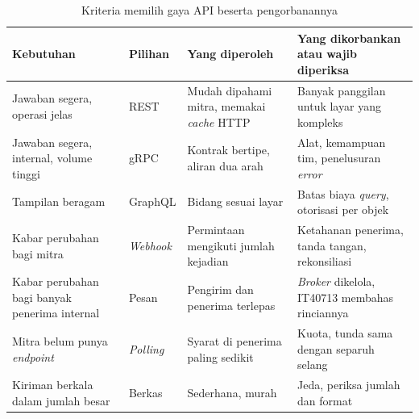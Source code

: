 \begin{table}[!htb]
  \centering
  \caption{Kriteria memilih gaya API beserta pengorbanannya}
  \label{tab:ch05-kriteria}
  \footnotesize
  \begin{tabularx}{\textwidth}{V{2.8cm}V{2.0cm}UU}
    \hline
    \textbf{Kebutuhan} & \textbf{Pilihan} & \textbf{Yang diperoleh} & \textbf{Yang dikorbankan atau wajib diperiksa} \\ \hline
    Jawaban segera, operasi jelas & REST & Mudah dipahami mitra, memakai \textit{cache} HTTP & Banyak panggilan untuk layar yang kompleks \\ \hline
    Jawaban segera, internal, volume tinggi & gRPC & Kontrak bertipe, aliran dua arah & Alat, kemampuan tim, penelusuran \textit{error} \\ \hline
    Tampilan beragam & GraphQL & Bidang sesuai layar & Batas biaya \textit{query}, otorisasi per objek \\ \hline
    Kabar perubahan bagi mitra & \textit{Webhook} & Permintaan mengikuti jumlah kejadian & Ketahanan penerima, tanda tangan, rekonsiliasi \\ \hline
    Kabar perubahan bagi banyak penerima internal & Pesan & Pengirim dan penerima terlepas & \textit{Broker} dikelola, IT40713 membahas rinciannya \\ \hline
    Mitra belum punya \textit{endpoint} & \textit{Polling} & Syarat di penerima paling sedikit & Kuota, tunda sama dengan separuh selang \\ \hline
    Kiriman berkala dalam jumlah besar & Berkas & Sederhana, murah & Jeda, periksa jumlah dan format \\ \hline
  \end{tabularx}
\end{table}

